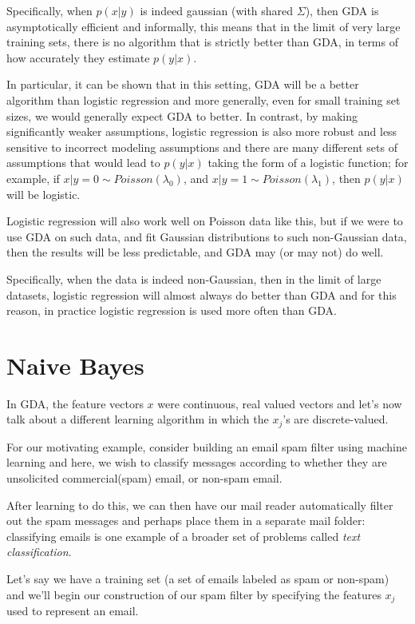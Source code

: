 Specifically, when $p(x | y)$ is indeed gaussian (with shared $\Sigma$), then GDA is asymptotically efficient
and informally, this means that in the limit of very large training sets, there is no algorithm that
is strictly better than GDA, in terms of how accurately they estimate $p(y |x)$.

In particular, it can be shown that in this setting, GDA will be a better algorithm than logistic regression
and more generally, even for small training set sizes, we would generally expect GDA to better.\newline
In contrast, by making significantly weaker assumptions, logistic regression is also more robust 
and less sensitive to incorrect modeling assumptions and there are many different sets of assumptions that
would lead to $p(y |x)$ taking the form of a logistic function; for example, if $x | y = 0 \sim Poisson(\lambda_0)$,
and $x | y = 1 \sim Poisson(\lambda_1)$, then $p(y | x)$ will be logistic.

Logistic regression will also work well on Poisson data like this, but if we were to use GDA on such data,
and fit Gaussian distributions to such non-Gaussian data, then the results will be less predictable,
and GDA may (or may not) do well.

Specifically, when the data is indeed non-Gaussian, then in the limit of large datasets, logistic regression will
almost always do better than GDA and for this reason, in practice logistic regression is used more often than GDA.

\section{Naive Bayes}
In GDA, the feature vectors $x$ were continuous, real valued vectors and let’s now talk about a 
different learning algorithm in which the $x_j$’s are discrete-valued.

For our motivating example, consider building an email spam filter using machine learning and here,
we wish to classify messages according to whether they are unsolicited commercial(spam) email, or non-spam email.

After learning to do this, we can then have our mail reader automatically filter out the spam messages and
perhaps place them in a separate mail folder: classifying emails is one example of a broader set of problems
called \emph{text classification}.

Let’s say we have a training set (a set of emails labeled as spam or non-spam) and we’ll begin our construction
of our spam filter by specifying the features $x_j$ used to represent an email.


